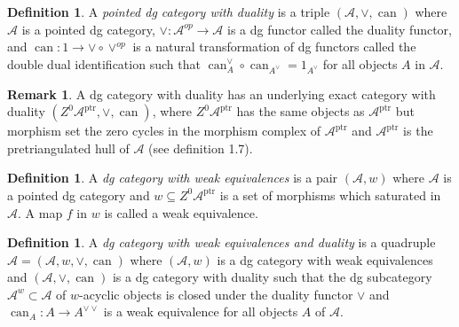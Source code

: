 \documentclass[draftthesis,tocnosub,noragright,centerchapter,10pt]{uiucthesis2009}
\newcommand{\mc}{\mathcal}
\newcommand{\ptr}{\mathrm{ptr}}
\DeclareMathOperator{\can}{can}
\theoremstyle{plain}
\theoremstyle{definition}
\newtheorem{definition}[lemma]{Definition}
\newtheorem{remark}[lemma]{Remark}
\begin{document}
\begin{definition}
A \emph{pointed dg category with duality} is a triple $(\mc
A,\vee,\can)$ where $\mc A$ is a pointed dg category, $\vee : \mc
A^{op} \rightarrow \mc A$ is a dg functor called the duality functor,
and $\can : 1 \rightarrow \vee \circ \vee^{op}$ is a natural
transformation of dg functors called the double dual identification
such that $\can_A^\vee \circ \can_{A^\vee} = 1_{A^\vee}$ for all
objects $A$ in $\mc A$. 
\end{definition}

\begin{remark}
A dg category with duality has an underlying
exact category with duality $(Z^0\mc
A^{\ptr},\vee,\can)$, where $Z^0\mc A^{\ptr}$ has the same objects
as $\mc A^{\ptr}$ but morphism set the zero cycles in the morphism
complex of $\mc A^\ptr$ and $\mc A^\ptr$ is the pretriangulated hull
of $\mc A$ (see \cite{Schder} definition 1.7).
\end{remark}

\begin{definition}
A \emph{dg category with weak equivalences} is a pair $(\mc A,w)$
where $\mc A$ is a pointed dg category and $w \subseteq Z^0 \mc
A^\ptr$ is a set of morphisms which saturated in $\mc A$. A map $f$ in
$w$ is called a weak equivalence.
\end{definition}

\begin{definition}
A \emph{dg category with weak equivalences and duality} is a quadruple
$\mathscr A = (\mc A, w, \vee, \can)$ where $(\mc A,w)$ is a dg
category with weak equivalences and $(\mc A,\vee,\can)$ is a dg
category with duality such that the dg subcategory $\mc A^w \subset
\mc A$ of $w$-acyclic objects is closed under the duality functor
$\vee$ and $\can_A : A \rightarrow A^{\vee\vee}$ is a weak equivalence
for all objects $A$ of $\mc A$. 
\end{definition}
\end{document}
